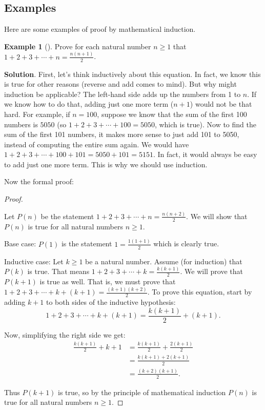 \documentclass[10pt,]{book}
\theoremstyle{plain}
\theoremstyle{definition}
\theoremstyle{definition}
\newtheorem{example}[theorem]{Example}
\theoremstyle{definition}
\theoremstyle{definition}
\numberwithin{equation}{chapter}
\newcommand{\amp}{&}
\begin{document}
\subsection[{Examples}]{Examples}\label{subsec_induction-examples}
\hypertarget{p-2115}{}%
Here are some examples of proof by mathematical induction.%
\begin{example}[]\label{example-74}
\hypertarget{p-2116}{}%
Prove for each natural number \(n \ge 1\) that \(1 + 2 + 3 + \cdots + n = \frac{n(n+1)}{2}\).%
\par\smallskip%
\noindent\textbf{Solution}.\hypertarget{solution-196}{}\quad%
\hypertarget{p-2117}{}%
First, let's think inductively about this equation. In fact, we know this is true for other reasons (reverse and add comes to mind). But why might induction be applicable? The left-hand side adds up the numbers from 1 to \(n\). If we know how to do that, adding just one more term (\(n+1\)) would not be that hard. For example, if \(n = 100\), suppose we know that the sum of the first 100 numbers is \(5050\) (so \(1 + 2 + 3 + \cdots + 100 = 5050\), which is true). Now to find the sum of the first 101 numbers, it makes more sense to just add 101 to 5050, instead of computing the entire sum again. We would have \(1 + 2 + 3 + \cdots + 100 + 101 = 5050 + 101 = 5151\). In fact, it would always be easy to add just one more term. This is why we should use induction.%
\par
\hypertarget{p-2118}{}%
Now the formal proof:%
\begin{proof}\hypertarget{proof-38}{}
\hypertarget{p-2119}{}%
Let \(P(n)\) be the statement \(1 + 2 + 3 + \cdots + n = \frac{n(n+2)}{2}\). We will show that \(P(n)\) is true for all natural numbers \(n \ge 1\).%
\par
\hypertarget{p-2120}{}%
Base case: \(P(1)\) is the statement \(1 = \frac{1(1+1)}{2}\) which is clearly true.%
\par
\hypertarget{p-2121}{}%
Inductive case: Let \(k \ge 1\) be a natural number. Assume (for induction) that \(P(k)\) is true. That means \(1 + 2 + 3 + \cdots + k = \frac{k(k+1)}{2}\). We will prove that \(P(k+1)\) is true as well. That is, we must prove that \(1 + 2 + 3 + \cdots + k + (k+1) = \frac{(k+1)(k+2)}{2}\). To prove this equation, start by adding \(k+1\) to both sides of the inductive hypothesis:%
\begin{equation*}
1 + 2 + 3 + \cdots + k + (k+1) = \frac{k(k+1)}{2} + (k+1).
\end{equation*}
%
\par
\hypertarget{p-2122}{}%
Now, simplifying the right side we get:%
\begin{align*}
\frac{k(k+1)}{2} + k+1 \amp = \frac{k(k+1)}{2} + \frac{2(k+1)}{2}\\
\amp = \frac{k(k+1) + 2(k+1)}{2}\\
\amp = \frac{(k+2)(k+1)}{2}.
\end{align*}
%
\par
\hypertarget{p-2123}{}%
Thus \(P(k+1)\) is true, so by the principle of mathematical induction \(P(n)\) is true for all natural numbers \(n \ge 1\).%
\end{proof}
\end{example}
\end{document}
